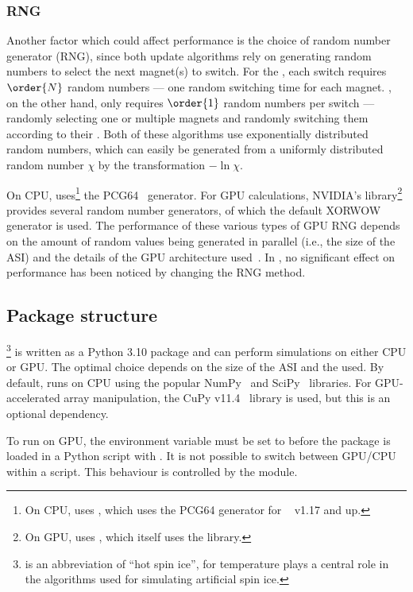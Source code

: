 \subsubsection{RNG}
Another factor which could affect performance is the choice of random number generator (RNG), since both update algorithms rely on generating random numbers to select the next magnet(s) to switch.
For the , each switch requires $\order{N}$ random numbers --- one random switching time for each magnet.
, on the other hand, only requires $\order{1}$ random numbers per switch --- randomly selecting one or multiple magnets and randomly switching them according to their .
Both of these algorithms use exponentially distributed random numbers, which can easily be generated from a uniformly distributed random number $\chi$ by the transformation $-\ln{\chi}$. \par
On CPU, \hotspice uses\footnote{
	On CPU, \hotspice uses , which uses the PCG64 generator for ~\cite{NumPy} v1.17 and up.
} the PCG64~\cite{PCG64} generator.
For GPU calculations, NVIDIA's  library\footnote{
	On GPU, \hotspice uses , which itself uses the  library.
} provides several random number generators, of which the default XORWOW~\cite{XORWOW} generator is used.
The performance of these various types of GPU RNG depends on the amount of random values being generated in parallel (i.e., the size of the ASI) and the details of the GPU architecture used~\cite{RNG_GPU_evaluation}.
In \hotspice, no significant effect on performance has been noticed by changing the RNG method.

\subsection{Package structure}\label{sec:2:API} %
\hotspice\footnote{
	\hotspice is an abbreviation of ``hot spin ice'', for temperature plays a central role in the  algorithms used for simulating artificial spin ice.
} is written as a Python 3.10 package and can perform simulations on either CPU or GPU.
The optimal  choice depends on the size of the ASI and the  used.
By default, \hotspice runs on CPU using the popular NumPy~\cite{NumPy} and SciPy~\cite{SciPy} libraries.
For GPU-accelerated array manipulation, the CuPy v11.4~\cite{CuPy} library is used, but this is an optional dependency. \par
To run on GPU, the environment variable  must be set to  before the \hotspice package is loaded in a Python script with .
It is not possible to switch between GPU/CPU within a script.
This behaviour is controlled by the \textbf{} module.


